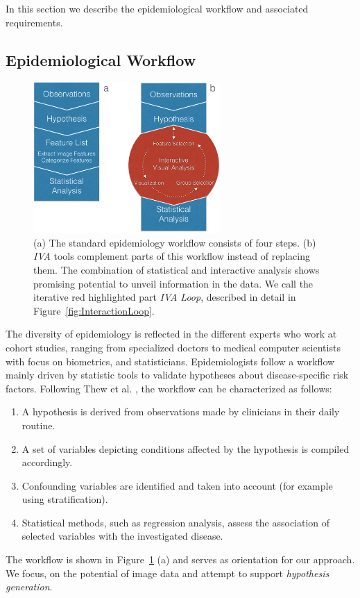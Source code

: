 \documentclass[journal]{style/vgtc} 			          %
\begin{document}
In this section we describe the epidemiological workflow and associated requirements.

\subsection{Epidemiological Workflow} \label{EpidemiologicalWorkflow}
\begin{figure}[htb]
 \centering
 \includegraphics[width=2.8in]{figures/workflow_comparison}
 \caption{
 (a) The standard epidemiology workflow consists of four steps.
 (b) \emph{IVA} tools complement parts of this workflow instead of replacing them.
 The combination of statistical and interactive analysis shows promising potential to unveil information in the data.
 We call the iterative red highlighted part \emph{IVA Loop}, described in detail in Figure~\ref{fig:InteractionLoop}.
 }
  \label{fig:WorkflowComparison}
\end{figure}
The diversity of epidemiology is reflected in the different experts who work at cohort studies, ranging from specialized doctors to medical computer scientists with focus on biometrics, and statisticians.
%
Epidemiologists follow a workflow mainly driven by statistic tools to validate hypotheses about disease-specific risk factors.
%
Following Thew et al. \cite{Thew2009}, the workflow can be characterized as follows:
%
\begin{enumerate}\itemsep0.1em
	\item A hypothesis is derived from observations made by clinicians in their daily routine.
%
	\item A set of variables depicting conditions affected by the hypothesis is compiled accordingly.
%
	\item Confounding variables are identified and taken into account (for example using stratification).
%
	\item Statistical methods, such as regression analysis, assess the association of selected variables with the investigated disease.
%
\end{enumerate}
The workflow is shown in Figure~\ref{fig:WorkflowComparison} (a) and serves as orientation for our approach. %
%
We focus, on the potential of image data and attempt to support \emph{hypothesis generation}.
\end{document}
